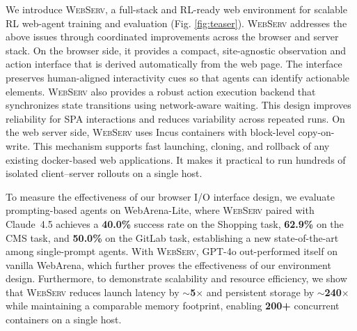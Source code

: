 \documentclass{article}
\DeclareRobustCommand{\projectname}{\textsc{WebServ}\xspace}
\begin{document}
We introduce \projectname, a full-stack and RL-ready web environment for scalable RL web-agent training and evaluation (Fig. \ref{fig:teaser}).
\projectname addresses the above issues through coordinated improvements across the browser and server stack. On the browser side, it provides a compact, site-agnostic observation and action interface that is derived automatically from the web page. The interface preserves human-aligned interactivity cues so that agents can identify actionable elements. \projectname also provides a robust action execution backend that synchronizes state transitions using network-aware waiting. This design improves reliability for SPA interactions and reduces variability across repeated runs. On the web  server side, \projectname uses Incus containers with block-level copy-on-write. This mechanism supports fast launching, cloning, and rollback of any existing docker-based web applications. It makes it practical to run hundreds of isolated client–server rollouts on a single host.

To measure the effectiveness of our browser I/O interface design, we evaluate prompting-based agents on WebArena-Lite, where \projectname paired with Claude~4.5 achieves a \textbf{40.0\%} success rate on the Shopping task, \textbf{62.9\%} on the CMS task, and \textbf{50.0\%} on the GitLab task, establishing a new state-of-the-art among single-prompt agents. 
With \projectname, GPT-4o out-performed itself on vanilla WebArena, which further proves the effectiveness of our environment design.
Furthermore, to demonstrate scalability and resource efficiency, we show that \projectname reduces launch latency by \textbf{$\sim$5$\times$} and persistent storage by \textbf{$\sim$240$\times$} while maintaining a comparable memory footprint, enabling \textbf{200+} concurrent containers on a single host.
\end{document}
